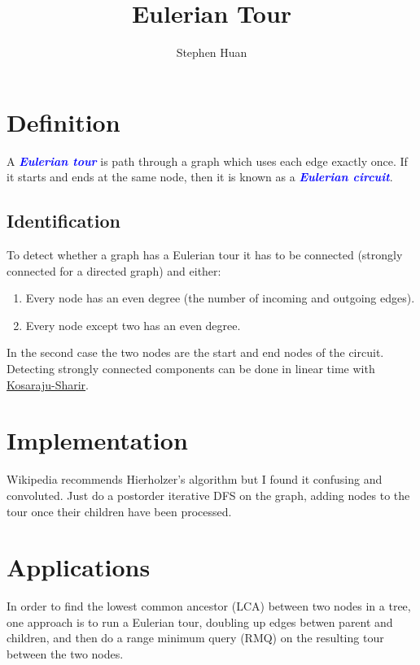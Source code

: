 \documentclass[11pt, oneside]{article}
\title{Eulerian Tour}
\author{Stephen Huan}
\newcommand{\emphasis}[1]{\textcolor{blue}{\textbf{\textit{#1}}}}
\begin{document}
\maketitle

\section{Definition}

A \emphasis{Eulerian tour} is path through a graph which uses each edge exactly once.
If it starts and ends at the same node, then it is known as a \emphasis{Eulerian circuit}.

\subsection{Identification}
To detect whether a graph has a Eulerian tour it has to be connected (strongly connected for a directed graph) and either:

\begin{enumerate}
  \item Every node has an even degree (the number of incoming and outgoing edges).
  \item Every node except two has an even degree.
\end{enumerate}

In the second case the two nodes are the start and end nodes of the circuit.
Detecting strongly connected components can be done in linear time with \href{https://activities.tjhsst.edu/sct/lectures/1920/2019_11_01_Strongly_Connected_Components.pdf}{Kosaraju-Sharir}.

\section{Implementation}

Wikipedia recommends Hierholzer's algorithm but I found it confusing and convoluted.
Just do a postorder iterative DFS on the graph, adding nodes to the tour once their children have been processed.

\section{Applications}

In order to find the lowest common ancestor (LCA) between two nodes in a tree,
one approach is to run a Eulerian tour, doubling up edges betwen parent and children,
and then do a range minimum query (RMQ) on the resulting tour between the two nodes.
\end{document}
